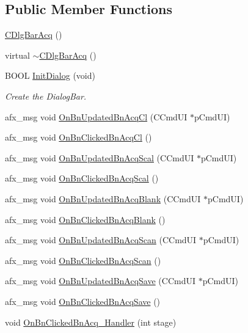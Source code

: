 \subsection*{Public Member Functions}
\begin{DoxyCompactItemize}
\item 
\hyperlink{classCDlgBarAcq_a870ec80473ca478a3a11ef362e15b25b}{CDlgBarAcq} ()
\item 
virtual \hyperlink{classCDlgBarAcq_a96831d23ec98c70054517687b0aef5e9}{$\sim$CDlgBarAcq} ()
\item 
BOOL \hyperlink{classCDlgBarAcq_aebb1dbb9ca695ae5f73bd5b76174f795}{InitDialog} (void)
\begin{DoxyCompactList}\small\item\em Create the DialogBar. \item\end{DoxyCompactList}\item 
afx\_\-msg void \hyperlink{classCDlgBarAcq_a12c901824e4c8ec115708148bc356901}{OnBnUpdatedBnAcqCl} (CCmdUI $\ast$pCmdUI)
\item 
afx\_\-msg void \hyperlink{classCDlgBarAcq_a6e0462a5ffadc7872d91318d5012250f}{OnBnClickedBnAcqCl} ()
\item 
afx\_\-msg void \hyperlink{classCDlgBarAcq_ac80c15f02781b244b1f44bf599f02892}{OnBnUpdatedBnAcqScal} (CCmdUI $\ast$pCmdUI)
\item 
afx\_\-msg void \hyperlink{classCDlgBarAcq_a15ddbb3c1aeaa81ba1d8ea6333e802ec}{OnBnClickedBnAcqScal} ()
\item 
afx\_\-msg void \hyperlink{classCDlgBarAcq_a906721ed8721ec87c779cc1cf0b7c28c}{OnBnUpdatedBnAcqBlank} (CCmdUI $\ast$pCmdUI)
\item 
afx\_\-msg void \hyperlink{classCDlgBarAcq_aa5db00f8c3d5ea1bb69b3fa8ae8c50cb}{OnBnClickedBnAcqBlank} ()
\item 
afx\_\-msg void \hyperlink{classCDlgBarAcq_a5fcdff284b8107ba38ee7ca9b5c71036}{OnBnUpdatedBnAcqScan} (CCmdUI $\ast$pCmdUI)
\item 
afx\_\-msg void \hyperlink{classCDlgBarAcq_a0930edeb526631541a2702ef5c047414}{OnBnClickedBnAcqScan} ()
\item 
afx\_\-msg void \hyperlink{classCDlgBarAcq_a6487cc294b19d8e547209b1b4cb7ebbd}{OnBnUpdatedBnAcqSave} (CCmdUI $\ast$pCmdUI)
\item 
afx\_\-msg void \hyperlink{classCDlgBarAcq_a6019a7d908c490712e875c4b4ed9af0e}{OnBnClickedBnAcqSave} ()
\item 
void \hyperlink{classCDlgBarAcq_a173e47e97f4b75b73aa641a6f1f11f1f}{OnBnClickedBnAcq\_\-Handler} (int stage)

\end{DoxyCompactItemize}
